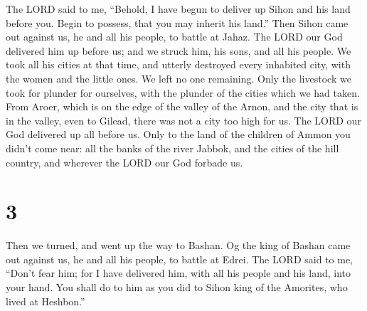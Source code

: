  The LORD said to me, ``Behold, I have begun to deliver
up Sihon and his land before you. Begin to possess, that you may inherit
his land.''  Then Sihon came out against us, he and all
his people, to battle at Jahaz.  The LORD our God
delivered him up before us; and we struck him, his sons, and all his
people.  We took all his cities at that time, and utterly
destroyed every inhabited city, with the women and the little ones. We
left no one remaining.  Only the livestock we took for
plunder for ourselves, with the plunder of the cities which we had
taken.  From Aroer, which is on the edge of the valley of
the Arnon, and the city that is in the valley, even to Gilead, there was
not a city too high for us. The LORD our God delivered up all before us.
 Only to the land of the children of Ammon you didn't
come near: all the banks of the river Jabbok, and the cities of the hill
country, and wherever the LORD our God forbade us.

\hypertarget{section-2}{%
\section{3}\label{section-2}}

 Then we turned, and went up the way to Bashan. Og the
king of Bashan came out against us, he and all his people, to battle at
Edrei.  The LORD said to me, ``Don't fear him; for I have
delivered him, with all his people and his land, into your hand. You
shall do to him as you did to Sihon king of the Amorites, who lived at
Heshbon.''

